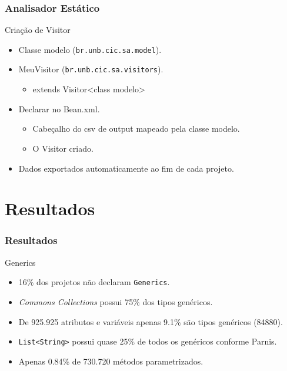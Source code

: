 \documentclass[]{beamer}
\begin{document}
\begin{frame}[label=metodologia, fragile]
	\frametitle{Analisador Estático}
	\begin{block}{Criação de Visitor}
		\begin{itemize}
			\item Classe modelo (\texttt{br.unb.cic.sa.model}).
			\item MeuVisitor (\texttt{br.unb.cic.sa.visitors}).
				\begin{itemize}
					\item extends Visitor<class modelo>
				\end{itemize}
			
			\item Declarar no Bean.xml.
					\begin{itemize}
						\item Cabeçalho do csv de output mapeado pela classe modelo.
						\item O Visitor criado.
					\end{itemize}
		
			\item Dados exportados automaticamente ao fim de cada projeto.
		
		\end{itemize}
		
	\end{block}
\end{frame}

	

	\section{Resultados}
	
	\begin{frame}[fragile, label=re]\frametitle{Resultados}
		\begin{block}{Generics}
			\begin{itemize}
				\item 16\% dos projetos não declaram \texttt{Generics}.
				
				\item \textit{Commons Collections} possui 75\% dos tipos genéricos.
				
				\item De 925.925 atributos e variáveis apenas 9.1\% são tipos genéricos (84880).
				
				\item \texttt{List<String>} possui quase 25\% de todos os genéricos conforme Parnis.
				
				\item Apenas 0.84\% de 730.720 métodos parametrizados.
				
				
			\end{itemize}
		\end{block}
	\end{frame}
\end{document}
